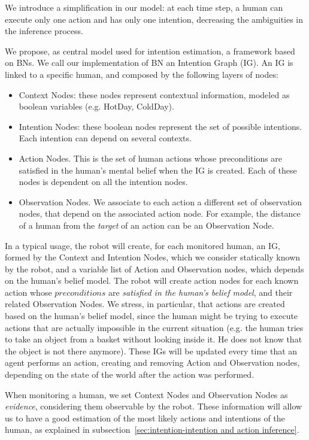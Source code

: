 We introduce a simplification in our model: at each time step, a human can execute only one action and has only one intention, decreasing the ambiguities in the inference process.

We propose, as central model used for intention estimation, a framework based on BNs. We call our implementation of BN an Intention Graph (IG).
An IG is linked to a specific human, and composed by the following layers of nodes:
\begin{itemize}
\item Context Nodes: these nodes represent contextual information, modeled as boolean variables (e.g. HotDay, ColdDay).
\item Intention Nodes: these boolean nodes represent the set of possible intentions. Each intention can depend on several contexts.
\item Action Nodes. This is the set of human actions whose preconditions are satisfied in the human's mental belief when the IG is created. Each of these nodes is dependent on all the intention nodes. 
\item Observation Nodes. We associate to each action a different set of observation nodes, that depend on the associated action node. For example, the distance of a human from the \textit{target} of an action can be an Observation Node.
\end{itemize}

In a typical usage, the robot will create, for each monitored human, an IG, formed by the Context and Intention Nodes, which we consider statically known by the robot, and a variable list of Action and Observation nodes, which depends on the human's belief model. The robot will create action nodes for each known action whose $preconditions$ are \textit{satisfied in the human's belief model}, and their related Observation Nodes. We stress, in particular, that actions are created based on the human's belief model, since the human might be trying to execute actions that are actually impossible in the current situation (e.g. the human tries to take an object from a basket without looking inside it. He does not know that the object is not there anymore).  These IGs will be updated every time that an agent performs an action, creating and removing Action and Observation nodes, depending on the state of the world after the action was performed.

When monitoring a human, we set Context Nodes and Observation Nodes as \textit{evidence}, considering them observable by the robot. These information will allow us to have a good estimation of the most likely actions and intentions of the human, as explained in subsection~\ref{sec:intention-intention and action inference}. 

